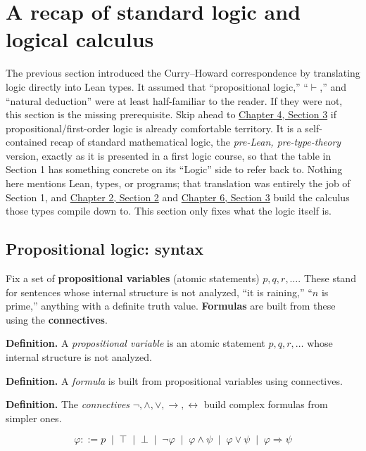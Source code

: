\section{A recap of standard logic and logical calculus}\label{sec:04-propositions-and-proofs:02-logic-recap:1}

The previous section introduced the Curry--Howard correspondence by translating logic directly into Lean types. It assumed that ``propositional logic,'' ``\(\vdash\),'' and ``natural deduction'' were at least half-familiar to the reader. If they were not, this section is the missing prerequisite. Skip ahead to \hyperref[sec:04-propositions-and-proofs:03-theorem-lemma:1]{Chapter 4, Section 3} if propositional/first-order logic is already comfortable territory. It is a self-contained recap of standard mathematical logic, the \emph{pre-Lean, pre-type-theory} version, exactly as it is presented in a first logic course, so that the table in Section 1 has something concrete on its ``Logic'' side to refer back to. Nothing here mentions Lean, types, or programs; that translation was entirely the job of Section 1, and \hyperref[sec:02-terminology-and-coc:02-pi-sigma-and-coc:1]{Chapter 2, Section 2} and \hyperref[sec:06-rigor-check:03-typing-rules-and-safety:1]{Chapter 6, Section 3} build the calculus those types compile down to. This section only fixes what the logic itself is.

\subsection{Propositional logic: syntax}\label{sec:04-propositions-and-proofs:02-logic-recap:2}

Fix a set of \textbf{propositional variables} (atomic statements) \(p, q, r,
\dots\). These stand for sentences whose internal structure is not analyzed, ``it is raining,'' ``\(n\) is prime,'' anything with a definite truth value. \textbf{Formulas} are built from these using the \textbf{connectives}.

\textbf{Definition.} A \emph{propositional variable} is an atomic statement \(p, q, r, \dots\) whose internal structure is not analyzed.

\textbf{Definition.} A \emph{formula} is built from propositional variables using connectives.

\textbf{Definition.} The \emph{connectives} \(\neg, \land, \lor, \to, \leftrightarrow\) build complex formulas from simpler ones.

\[
\varphi ::= p \;\mid\; \top \;\mid\; \bot \;\mid\; \neg\varphi \;\mid\;
\varphi \wedge \psi \;\mid\; \varphi \vee \psi \;\mid\;
\varphi \Rightarrow \psi
\]

